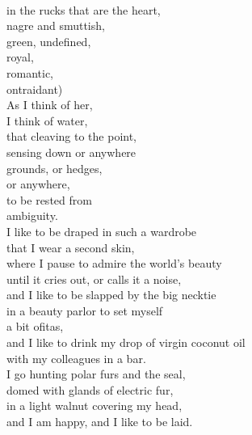 \documentclass[smalldemyvopaper,11pt,twoside,onecolumn,openright,extrafontsizes]{memoir}
\newlength\drop
\begin{document}
\\in the rucks that are the heart,
\\nagre and smuttish,
\\green, undefined,
\\royal,
\\romantic,
\\ontraidant)
\\As I think of her,
\\I think of water,
\\that cleaving to the point,
\\sensing down or anywhere
\\grounds, or hedges,
\\or anywhere,
\\to be rested from
\\ambiguity.
\\I like to be draped in such a wardrobe
\\that I wear a second skin,
\\where I pause to admire the world's beauty
\\until it cries out, or calls it a noise,
\\and I like to be slapped by the big necktie
\\in a beauty parlor to set myself
\\a bit ofitas,
\\and I like to drink my drop of virgin coconut oil
\\with my colleagues in a bar.
\\I go hunting polar furs and the seal,
\\domed with glands of electric fur,
\\in a light walnut covering my head,
\\and I am happy, and I like to be laid.
\end{document}
